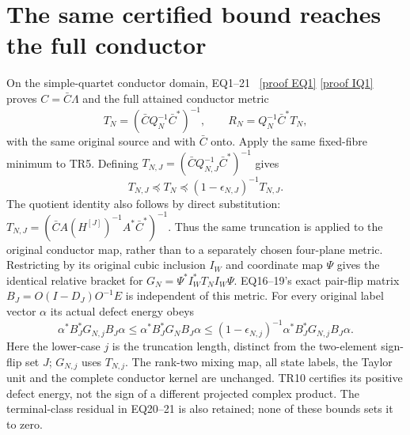 \documentclass[11pt]{article}
\begin{document}
\section{The same certified bound reaches the full conductor}
On the simple-quartet conductor domain, EQ1--21 \cite{EQ}%
~\href{https://github.com/KokunoYumeto/zeta-function-research-reader/blob/5992ad50c0f2a06921f1fcaded7b4e38097c0739/workbenches/splitzero-tandem/continuations/20260920-original-kernel-mixed-determinants/providers/original_minimum/EIGHT_STATE_ORIGINAL_MINIMUM.tex\#L61}{[proof EQ1]} \href{https://github.com/KokunoYumeto/zeta-function-research-reader/blob/5992ad50c0f2a06921f1fcaded7b4e38097c0739/workbenches/splitzero-tandem/continuations/20260920-original-kernel-mixed-determinants/providers/original_minimum/independent/EIGHT_STATE_QUOTIENT_REDERIVATION.tex\#L26}{[proof IQ1]}%
{} proves
$C=\bar C\Lambda$ and the full attained conductor metric
\[
 T_N=(\bar C Q_N^{-1}\bar C^*)^{-1},\qquad
 R_N=Q_N^{-1}\bar C^*T_N,
\]
with the same original source and with $\bar C$ onto. Apply the
same fixed-fibre minimum to TR5. Defining
$T_{N,J}=(\bar C Q_{N,J}^{-1}\bar C^*)^{-1}$ gives
\begin{equation}\tag{TR9}\label{eq:conductor}
 T_{N,J}\preceq T_N\preceq
                    (1-\epsilon_{N,J})^{-1}T_{N,J}.
\end{equation}
The quotient identity also follows by direct substitution:
$T_{N,J}=(\bar CA(H^{[J]})^{-1}A^*\bar C^*)^{-1}$.
Thus the same truncation is applied to the original conductor
map, rather than to a separately chosen four-plane metric.
Restricting by its original cubic inclusion $I_W$ and coordinate
map $\Psi$ gives the identical relative bracket for
$G_N=\Psi^*I_W^*T_NI_W\Psi$. EQ16--19's exact pair-flip matrix
$B_J=O(I-D_J)O^{-1}E$ is independent of this metric. For every
original label vector $\alpha$ its actual defect energy obeys
\begin{equation}\tag{TR10}\label{eq:energy}
 \alpha^*B_J^*G_{N,j}B_J\alpha
 \le\alpha^*B_J^*G_NB_J\alpha
 \le(1-\epsilon_{N,j})^{-1}\alpha^*B_J^*G_{N,j}B_J\alpha.
\end{equation}
Here the lower-case $j$ is the truncation length, distinct from
the two-element sign-flip set $J$; $G_{N,j}$ uses $T_{N,j}$.
The rank-two mixing map, all state labels, the Taylor unit and
the complete conductor kernel are unchanged. TR10 certifies its
positive defect energy, not the sign of a different projected
complex product. The terminal-class residual in EQ20--21 is
also retained; none of these bounds sets it to zero.
\end{document}
